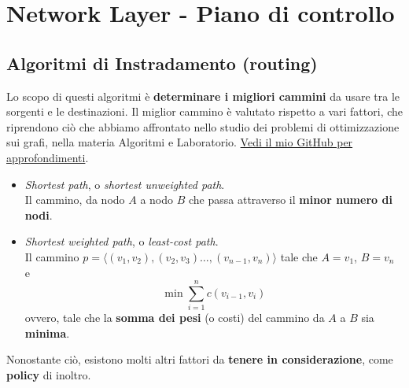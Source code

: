 \chapter{Network Layer - Piano di controllo}

\section{Algoritmi di Instradamento (routing)}
Lo scopo di questi algoritmi è \textbf{determinare i migliori cammini} da usare tra le sorgenti e le destinazioni. Il miglior cammino è valutato rispetto a vari fattori, che riprendono ciò che abbiamo affrontato nello studio dei problemi di ottimizzazione sui grafi, nella materia Algoritmi e Laboratorio. \href{https://github.com/BoredDam/Algoritmi}{Vedi il mio GitHub per approfondimenti}.

\begin{itemize}
	\item \textit{Shortest path}, o \textit{shortest unweighted path}.\\
	Il cammino, da nodo $A$ a nodo $B$ che passa attraverso il \textbf{minor numero di nodi}.
	
	\item \textit{Shortest weighted path}, o \textit{least-cost path}.\\
	Il cammino $p= \langle (v_1, v_2), (v_2, v_3) \dots, (v_{n-1},v_n) \rangle$ tale che $A=v_1$, $B = v_n$ e 
	$$
	\min \sum_{i=1}^n c(v_{i-1}, v_i)
	$$
	ovvero, tale che la \textbf{somma dei pesi} (o costi) del cammino da $A$ a $B$ sia \textbf{minima}.
\end{itemize}

Nonostante ciò, esistono molti altri fattori da \textbf{tenere in considerazione}, come \textbf{policy} di inoltro.

